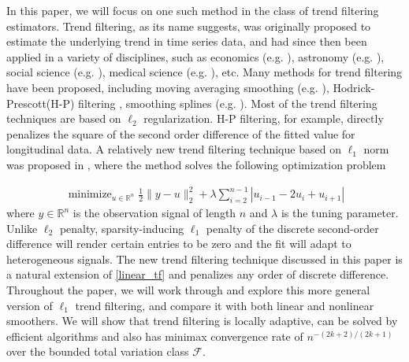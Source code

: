 \documentclass[a4paper]{article}
\newcommand{\RR}{\mathbb{R}}
\renewcommand{\cal}{\mathcal}
\DeclareMathOperator*{\minimize}{minimize}
\begin{document}
In this paper, we will focus on one such method in the class of trend filtering estimators. Trend filtering, as its name suggests, was originally proposed to estimate the underlying trend in time series data, and had since then been applied in a variety of disciplines, such as economics (e.g. \cite{hodrick1997postwar,tsay2005analysis}), astronomy (e.g. \cite{kovacs2008application}), social science (e.g. \cite{saha2012learning,levitt2004understanding}), medical science (e.g. \cite{greenland1992methods,link1994estimating}), etc. Many methods for trend filtering have been proposed, including moving averaging smoothing (e.g. \cite{leser1961simple,kendall1946advanced,lucas1980two}), Hodrick-Prescott(H-P) filtering \cite{hodrick1997postwar},  smoothing splines (e.g. \cite{de1978practical,wahba1990spline,green1993nonparametric}). Most of the trend filtering techniques are based on $\ell_2$ regularization. H-P filtering, for example, directly penalizes the square of the second order difference of the fitted value for longitudinal data. A relatively new trend filtering technique based on $\ell_1$ norm was proposed in \cite{kim2009ell_1}, where the method solves the following optimization problem 

\begin{align}
\minimize_{u\in\RR^n} \frac{1}{2}\|y-u\|_2^2 + \lambda\sum_{i=2}^{n-1} |u_{i-1} - 2u_i + u_{i+1}|  \label{linear_tf}
\end{align}
where $y\in\RR^n$ is the observation signal of length $n$ and $\lambda$ is the tuning parameter. Unlike $\ell_2$ penalty, sparsity-inducing $\ell_1$ penalty of the discrete second-order difference will render certain entries to be zero and the fit will adapt to heterogeneous signals. The new trend filtering technique discussed in this paper is a natural extension of \eqref{linear_tf} and penalizes any order of discrete difference. Throughout the paper, we will work through and explore this more general version of $\ell_1$ trend filtering, and compare it with both linear and nonlinear smoothers. We will show that trend filtering is locally adaptive, can be solved by efficient algorithms and also has minimax convergence rate of $n^{-(2k+2)/(2k+1)}$ over the bounded total variation class $\cal{F}$.
\end{document}
